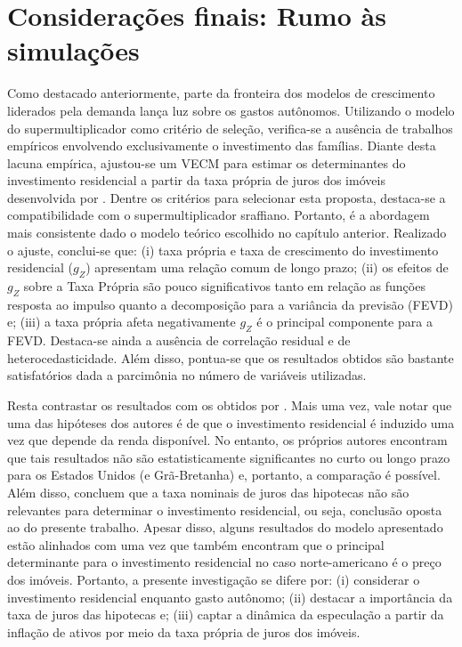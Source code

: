 \section{Considerações finais: Rumo às simulações}
\label{Conclucao_Empirica}


Como destacado anteriormente, parte da fronteira dos modelos de crescimento liderados pela demanda lança luz sobre os gastos autônomos. Utilizando o modelo do supermultiplicador como critério de seleção, verifica-se a ausência de trabalhos empíricos envolvendo exclusivamente o investimento das famílias. 
Diante desta lacuna empírica, ajustou-se um VECM para estimar os determinantes do investimento residencial a partir da taxa própria de juros dos imóveis desenvolvida por \textcite{teixeira_crescimento_2015}. Dentre os critérios para selecionar esta proposta, destaca-se a compatibilidade com o supermultiplicador sraffiano. Portanto, é a abordagem mais consistente dado o modelo teórico escolhido no capítulo anterior. Realizado o ajuste, conclui-se que: 
(i) taxa própria e taxa de crescimento do investimento residencial ($g_Z$) apresentam uma relação comum de longo prazo; 
(ii) os efeitos de $g_Z$ sobre a Taxa Própria são pouco significativos tanto em relação as funções resposta ao impulso quanto a decomposição para a variância da previsão (FEVD) e;
(iii) a taxa própria afeta negativamente $g_Z$ é o principal componente para a FEVD. 
Destaca-se ainda a ausência de correlação residual e de heterocedasticidade. Além disso, pontua-se que os resultados obtidos são bastante satisfatórios dada a parcimônia no número de variáveis utilizadas.

Resta contrastar os resultados com os obtidos por \textcite{arestis_residential_2015}. Mais uma vez, vale notar que uma das hipóteses dos autores é de que o investimento residencial é induzido uma vez que depende da renda disponível. No entanto, os próprios autores encontram que tais resultados não são estatisticamente significantes no curto ou longo prazo para os Estados Unidos (e Grã-Bretanha) e, portanto, a comparação é possível. Além disso, concluem que a taxa nominais de juros das hipotecas não são relevantes para determinar o investimento residencial, ou seja, conclusão oposta ao do presente trabalho. Apesar disso, alguns resultados do modelo apresentado estão alinhados com \textcite{arestis_residential_2015} uma vez que também encontram que o principal determinante para o investimento residencial no caso norte-americano é o preço dos imóveis. Portanto, a presente investigação se difere por: (i) considerar o investimento residencial enquanto gasto autônomo; (ii) destacar a importância da taxa de juros das hipotecas e; (iii) captar a dinâmica da especulação a partir da inflação de ativos por meio da taxa própria de juros dos imóveis.  

